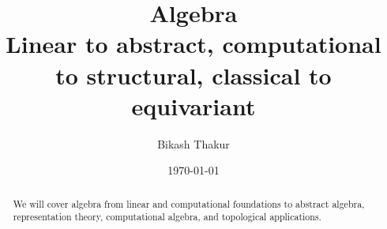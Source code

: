 \documentclass[11pt]{article}
\title{%
    {\sffamily\huge\bfseries\color{DarkNavy} Algebra}\\[6pt]
    {\sffamily\large\color{AccentGray} Linear to abstract, computational to structural, classical to equivariant}
}
\author{{\sffamily Bikash Thakur}}
\date{{\sffamily\small\color{AccentGray} \today}}
\begin{document}

\pagecolor{OffWhite}
\color{DarkNavy}

\maketitle
\thispagestyle{plain}

\begin{abstract}
\noindent
We will cover algebra from linear and computational foundations to abstract algebra, representation theory, computational algebra, and topological applications.
\end{abstract}

\tableofcontents
\newpage



\printindex
\end{document}
